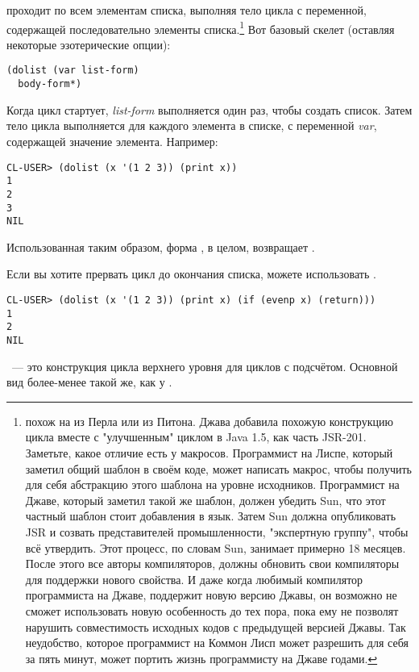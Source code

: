  проходит по всем элементам списка, выполняя тело цикла с переменной,
содержащей последовательно элементы списка.\footnote{ похож на 
  из Перла или  из Питона. Джава добавила похожую конструкцию цикла вместе с
  "улучшенным"  циклом в Java 1.5, как часть JSR-201. Заметьте, какое отличие
  есть у макросов. Программист на Лиспе, который заметил общий шаблон в своём коде, может
  написать макрос, чтобы получить для себя абстракцию этого шаблона на уровне
  исходников. Программист на Джаве, который заметил такой же шаблон, должен убедить Sun,
  что этот частный шаблон стоит добавления в язык. Затем Sun должна опубликовать JSR и
  созвать представителей промышленности, "экспертную группу", чтобы всё утвердить. Этот
  процесс, по словам Sun, занимает примерно 18 месяцев. После этого все авторы
  компиляторов, должны обновить свои компиляторы для поддержки нового свойства. И даже
  когда любимый компилятор программиста на Джаве, поддержит новую версию Джавы, он
  возможно не сможет использовать новую особенность до тех пора, пока ему не позволят
  нарушить совместимость исходных кодов с предыдущей версией Джавы. Так неудобство,
  которое программист на Коммон Лисп может разрешить для себя за пять минут, может портить
  жизнь программисту на Джаве годами.} Вот базовый скелет (оставляя некоторые
эзотерические опции):

\begin{lstlisting}
(dolist (var list-form)
  body-form*)
\end{lstlisting}

Когда цикл стартует, \textit{list-form} выполняется один раз, чтобы создать список. Затем
тело цикла выполняется для каждого элемента в списке, с переменной \textit{var},
содержащей значение элемента. Например:

\begin{lstlisting}
CL-USER> (dolist (x '(1 2 3)) (print x))
1
2
3
NIL
\end{lstlisting}

Использованная таким образом, форма , в целом, возвращает .

Если вы хотите прервать цикл  до окончания списка, можете использовать
.

\begin{lstlisting}
CL-USER> (dolist (x '(1 2 3)) (print x) (if (evenp x) (return)))
1
2
NIL
\end{lstlisting}

~--- это конструкция цикла верхнего уровня для циклов с подсчётом. Основной
вид более-менее такой же, как у .

